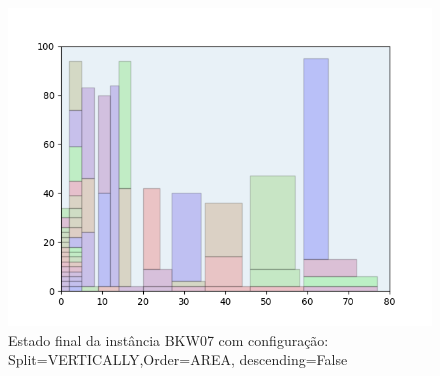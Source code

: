\begin{figure}[H]
    \centering
    \caption[]{Estado final da instância BKW07 com configuração: Split=VERTICALLY,Order=AREA, descending=False}
    \label{fig:bkw07-vertically-area-false}
    \includegraphics[scale=0.5]{output/figures/bkw/bkw07/vertically/area/false/00}
\end{figure}